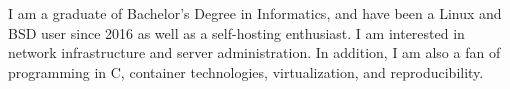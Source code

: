 

\begin{cvparagraph}

  I am a graduate of Bachelor's Degree in Informatics, and have been a Linux and BSD user since 2016 as well as a self-hosting enthusiast. I am interested in network infrastructure and server administration. In addition, I am also a fan of programming in C, container technologies, virtualization, and reproducibility.
\end{cvparagraph}

